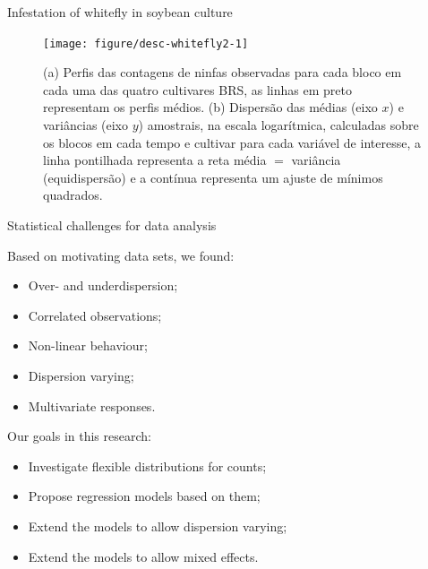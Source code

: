 \documentclass[11pt]{beamer}\usepackage[]{graphicx}\usepackage[]{color}
\newenvironment{knitrout}{}{} %
\begin{document}
\begin{frame}{Infestation of whitefly in soybean culture}

\vspace{-0.5cm}
\begin{knitrout}
\color{fgcolor}\begin{figure}[!htb]

{\centering \texttt{[image: figure/desc-whitefly2-1]} 

}

\caption[(a) Perfis das contagens de ninfas observadas para cada bloco em cada uma das quatro cultivares BRS, as linhas em preto representam os perfis médios]{(a) Perfis das contagens de ninfas observadas para cada bloco em cada uma das quatro cultivares BRS, as linhas em preto representam os perfis médios. (b) Dispersão das médias (eixo $x$) e variâncias (eixo $y$) amostrais, na escala logarítmica, calculadas sobre os blocos em cada tempo e cultivar para cada variável de interesse, a linha pontilhada representa a reta média $=$ variância (equidispersão) e a contínua representa um ajuste de mínimos quadrados.}\label{fig:desc-whitefly2}
\end{figure}


\end{knitrout}

\end{frame}

\begin{frame}{Statistical challenges for data analysis}

  Based on motivating data sets, we found:
  \begin{itemize}
    \item Over- and underdispersion;
    \item Correlated observations;
    \item Non-linear behaviour;
    \item Dispersion varying;
    \item Multivariate responses.
  \end{itemize}
  \vspace{0.4cm}

  Our goals in this research:
  \begin{itemize}
  \item Investigate flexible distributions for counts;
  \item Propose regression models based on them;
  \item Extend the models to allow dispersion varying;
  \item Extend the models to allow mixed effects.
  \end{itemize}

\end{frame}
\end{document}
